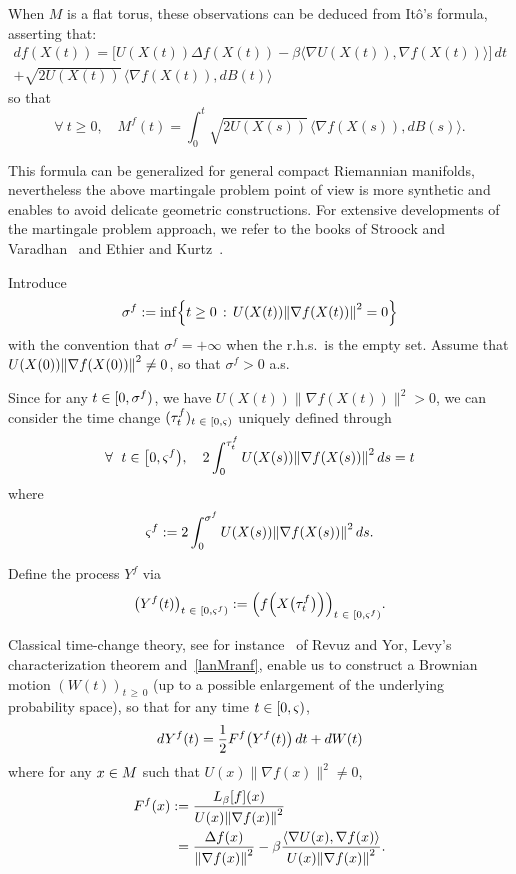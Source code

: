 \documentclass[10pt]{amsart}
\theoremstyle{definition}\newtheorem{defi}[theo]{Definition}\newtheorem{rema}[theo]{Remark}\newtheorem{exam}[theo]{Example}\newtheorem{exem}[theo]{Example}\newtheorem{nota}[theo]{Notation}
\newcommand{\f}[2]{\frac{#1}{#2}}
\newcommand{\iy}{\infty}
\newcommand{\na}{\nabla}
\newcommand{\tr}{\Delta}
\newcommand{\fo}{\forall\ }
\let\originalleft\left
\let\originalright\right
\renewcommand{\left}{\mathopen{}\mathclose\bgroup\originalleft}
\renewcommand{\right}{\aftergroup\egroup\originalright}
\let\oldin\in
\renewcommand{\in}{\mathchoice{\oldin}{\oldin}{\,\oldin\,}{\,\oldin\,}}
\newcommand*{\Mk}{\mkern -2mu}
\newcommand*{\MK}{\mkern 2mu}
\let\oldforall\forall
\renewcommand*{\forall}{\mathrel{\oldforall}}
\begin{document}
When $M$ is a flat torus, these observations can be deduced from Itô's formula, asserting that:
\begin{align*}
d f(X(t))=\bigl[U(X(t))\tr f(X(t))-\beta \langle \na U(X(t)), \na f(X(t))\rangle\bigr] \, dt \\
+\sqrt{2 U(X(t))}\, \langle \na f(X(t)),dB(t)\rangle
\end{align*}
so that
\begin{equation*}
\fo t\geq 0,\quad M^f(t) = \int_0^t\sqrt{2 U(X(s))}\, \langle \na f(X(s)),dB(s)\rangle.
\end{equation*}


This formula can be generalized for general compact Riemannian manifolds, nevertheless the above martingale problem point of view is more synthetic and enables to avoid delicate geometric constructions. For extensive developments of the martingale problem approach, we refer to the books of Stroock and Varadhan~\cite{MR2190038} and Ethier and Kurtz~\cite{MR838085}.


 Introduce
\begin{equation*}
\sigma^f := \inf\left\{t\geq 0\,:\, U(X(t))\left\| \na f(X(t))\right\|^2=0\right\}
\end{equation*}
with the convention that $\sigma^f=+\iy$ when the r.h.s.\ is the empty set. Assume that $U(X(0))\left\| \na f(X(0))\right\|^2\neq 0$, so that $\sigma^f>0$ a.s.


Since for any $t\in[0,\sigma^f)$, we have $ U(X(t))\| \na f(X(t))\|^2>0$, we can consider the time change $(\tau^f_t)_{t\in[0,\varsigma)}$ uniquely defined through
\begin{equation*}
\fo t\in\bigl[0,\varsigma^f\bigr),\quad 2\int_0^{\tau^f_t} U(X(s))\left\| \na f(X(s))\right\|^2\, ds = t
\end{equation*}
where
\begin{equation*}
\varsigma^f := 2\int_0^{\sigma^f} U(X(s))\left\| \na f(X(s))\right\|^2\, ds.
\end{equation*}


Define the process $Y^f$ via
\begin{equation*}
\left(Y^f(t)\right)_{t\in \left[0,\varsigma^f\right)} := \left(f\left(X\bigl(\tau^f_t\bigr)\right)\right)_{t\in \left[0,\varsigma^f\right)}.
\end{equation*}


Classical time-change theory, see for instance~\cite[Section~1, Chapter~5]{MR1725357} of Revuz and Yor, Levy's characterization theorem and~\eqref{lanMranf}, enable us to construct a Brownian motion $(W(t))_{t\,\geq\,0}$ (up to a possible enlargement of the underlying probability space), so that for any time $t\in[0,\varsigma)$,
\begin{equation*}
dY^f(t) = 
\f12F^f\left(Y^f(t)\right) \, dt +dW(t)
\end{equation*}
where for any $x\in M$ such that $U(x)\| \na f(x)\|^2\neq 0$,
\begin{align*}
F^f(x)\,\MK &\!\Mk:= \f{L_\beta[f](x)}{U(x)\left\| \na f(x)\right\|^2}\\
&= 
\f{\tr f(x)}{\left\| \na f(x)\right\|^2}-\beta\f{\left\langle\na U(x),\na f(x)\right\rangle}{U(x)\left\| \na f(x)\right\|^2}.
\end{align*}
\end{document}
